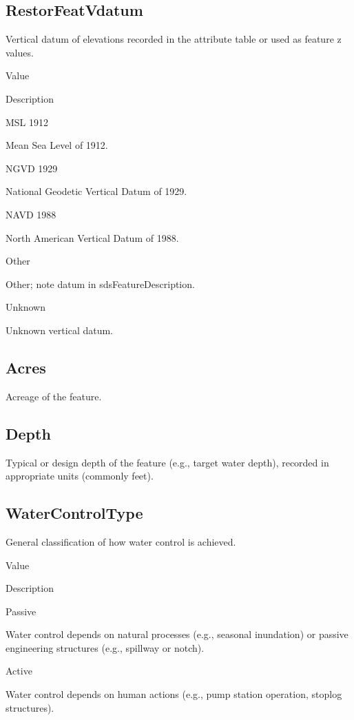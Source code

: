 \documentclass[
  letterpaper,
  DIV=11,
  numbers=noendperiod]{scrreprt}
\begin{document}
\subsection{RestorFeatVdatum}\label{restorfeatvdatum-8}

Vertical datum of elevations recorded in the attribute table or used as
feature z values.

Value

Description

MSL 1912

Mean Sea Level of 1912.

NGVD 1929

National Geodetic Vertical Datum of 1929.

NAVD 1988

North American Vertical Datum of 1988.

Other

Other; note datum in sdsFeatureDescription.

Unknown

Unknown vertical datum.

\subsection{Acres}\label{acres-1}

Acreage of the feature.

\subsection{Depth}\label{depth}

Typical or design depth of the feature (e.g., target water depth),
recorded in appropriate units (commonly feet).

\subsection{WaterControlType}\label{watercontroltype}

General classification of how water control is achieved.

Value

Description

Passive

Water control depends on natural processes (e.g., seasonal inundation)
or passive engineering structures (e.g., spillway or notch).

Active

Water control depends on human actions (e.g., pump station operation,
stoplog structures).
\end{document}
